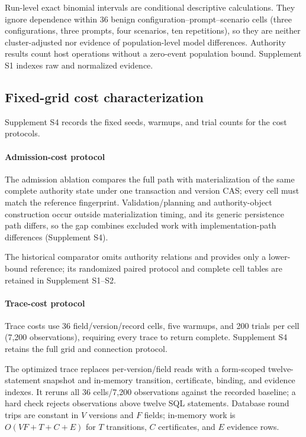 Run-level exact binomial intervals are conditional descriptive calculations. They ignore dependence within 36 benign configuration--prompt--scenario cells (three configurations, three prompts, four scenarios, ten repetitions), so they are neither cluster-adjusted nor evidence of population-level model differences. Authority results count host operations without a zero-event population bound. Supplement S1 indexes raw and normalized evidence.

\subsection{Fixed-grid cost characterization}

Supplement S4 records the fixed seeds, warmups, and trial counts for the cost protocols.

\paragraph{Admission-cost protocol}
The admission ablation compares the full path with materialization of the same complete authority state under one transaction and version CAS; every cell must match the reference fingerprint. Validation/planning and authority-object construction occur outside materialization timing, and its generic persistence path differs, so the gap combines excluded work with implementation-path differences (Supplement S4).

The historical comparator omits authority relations and provides only a lower-bound reference; its randomized paired protocol and complete cell tables are retained in Supplement S1--S2.

\paragraph{Trace-cost protocol}
Trace costs use 36 field/version/record cells, five warmups, and 200 trials per cell (7,200 observations), requiring every trace to return complete. Supplement S4 retains the full grid and connection protocol.

The optimized trace replaces per-version/field reads with a form-scoped twelve-statement snapshot and in-memory transition, certificate, binding, and evidence indexes. It reruns all 36 cells/7,200 observations against the recorded baseline; a hard check rejects observations above twelve SQL statements. Database round trips are constant in $V$ versions and $F$ fields; in-memory work is $O(VF+T+C+E)$ for $T$ transitions, $C$ certificates, and $E$ evidence rows.

